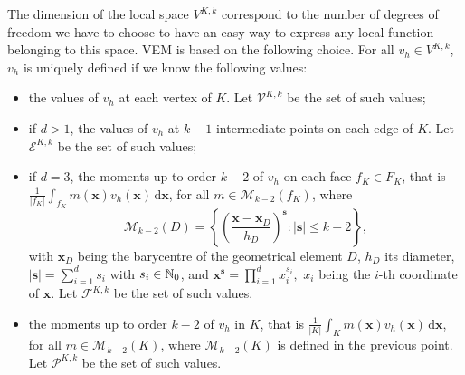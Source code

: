 The dimension of the local space $V^{K,k}$ correspond to the number of degrees of freedom we have to choose to have an easy way to express any local function belonging to this space. VEM is based on the following choice. For all $v_h\in V^{K,k}$, $v_h$ is uniquely defined if we know the following values:
\begin{itemize}
\item the values of $v_h$ at each vertex of $K$. Let $\mathcal{V}^{K,k}$ be the set of such values;
\item if $d>1$, the values of $v_h$ at $k-1$ intermediate points on each edge of $K$. Let $\mathcal{E}^{K,k}$ be the set of such values;
\item if $d=3$, the moments up to order $k-2$ of $v_h$ on each face $f_K\in F_K$, that is $\frac{1}{|f_K|}\int_{f_K}m(\mathbf{x})v_h(\mathbf{x})\, \mathrm{d}\mathbf{x}$, for all $m\in \mathcal{M}_{k-2}(f_K)$, where $$\mathcal{M}_{k-2}(D) = \left\{\left(\frac{\mathbf{x}-\mathbf{x}_D}{h_D}\right)^\mathbf{s} : |\mathbf{s}|\leq k-2\right\},$$ with $\mathbf{x}_D$ being the barycentre of the geometrical element $D$, $h_D$ its diameter, $|\mathbf{s}| = \sum_{i=1}^d s_i$ with $s_i\in \mathbb{N}_0$, and $\mathbf{x}^\mathbf{s}=\prod_{i=1}^d x_i^{s_i},$ $x_i$ being the $i$-th coordinate of $\mathbf{x}$. Let $\mathcal{F}^{K,k}$ be the set of such values.
\item the moments up to order $k-2$ of $v_h$ in $K$, that is $\frac{1}{|K|}\int_Km(\mathbf{x})v_h(\mathbf{x})\, \mathrm{d}\mathbf{x}$, for all $m\in \mathcal{M}_{k-2}(K)$, where $\mathcal{M}_{k-2}(K)$ is defined in the previous point. Let $\mathcal{P}^{K,k}$ be the set of such values.
\end{itemize}

